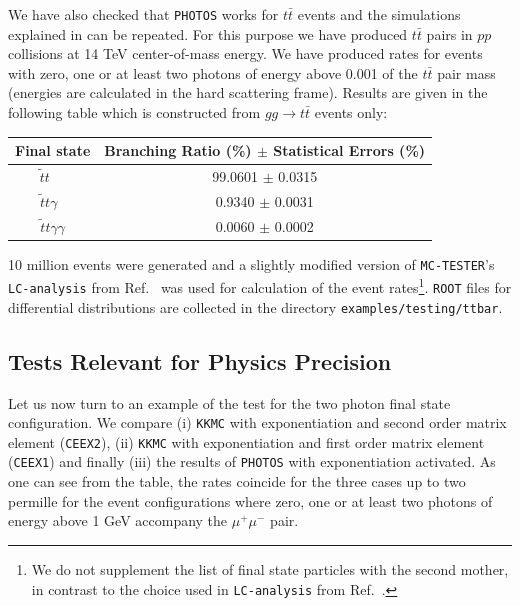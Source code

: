 \documentclass[]{Photos_interface_design}
\begin{document}
We have also checked that {\tt PHOTOS} works for $t \bar t$ events and the simulations explained in \cite{RichterWas:1993ta} can be repeated.
For this purpose we have produced $t \bar t$ pairs in $pp$ collisions at 
14 TeV center-of-mass energy. We have produced rates for events with zero, one or
at least two photons of energy above 0.001 of the $t \bar t$ pair mass
(energies are calculated in  the hard scattering frame).
Results are given in the following table which is constructed from  
$gg \to t \bar t$ events only:


\vspace{0.3cm} 
\begin{center}
{ \begin{tabular}{c c} 
\toprule 
Final state &  Branching Ratio (\%) $\pm$ Statistical Errors (\%) \\  
\midrule
{$ \widetilde{t} t \; \;\; \;$}  &  {99.0601 $\pm$ 0.0315}  \\ 
 {$  \widetilde{t} t \gamma \;\;$} &   { 0.9340 $\pm$  0.0031}   \\ 
{$  \widetilde{t} t \gamma \gamma$}  &  { 0.0060 $\pm$  0.0002}  \\ 
\bottomrule
\end{tabular} 
}  
\end{center} 

10 million events were generated and a slightly modified 
version of {\tt MC-TESTER}'s {\tt LC-analysis} from Ref.~\cite{Golonka:2002rz}
was used for calculation of the event rates\footnote{  We do not supplement the list of 
final state particles with the second mother, in contrast to the choice used in {\tt LC-analysis} from  Ref.~\cite{Golonka:2002rz}. }.
{\tt ROOT} files for differential distributions are 
collected in the directory {\tt examples/testing/ttbar}. 

\subsection{Tests Relevant for Physics Precision}


Let us now turn to an example of the test for the two photon final state configuration.
We compare (i) {\tt KKMC} \cite{kkcpc:1999} with exponentiation and second order matrix element ({\tt CEEX2}), (ii) {\tt KKMC} with exponentiation and first order matrix element ({\tt CEEX1})
and finally (iii) the results of {\tt PHOTOS} with exponentiation activated. As one can see from the table, the rates 
coincide for the three cases up to two permille for the event configurations 
where zero, one or at least two photons of energy above 1 GeV accompany the $\mu^+\mu^-$ pair.
\end{document}
